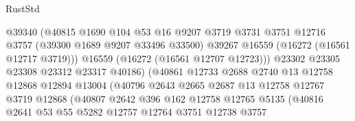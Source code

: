 \begin{lexlean}{RustStd}
\begin{coremodule}
                                    @39340
                                    (@40815
                                      @1690
                                      @104
                                      @53
                                      @16
                                      @9207
                                      @3719
                                      @3731
                                      @3751
                                      @12716
                                      @3757
                                      (@39300 @1689 @9207 @33496 @33500)
                                      @39267
                                      @16559
                                      (@16272 (@16561 @12717 @3719)))
                                    @16559
                                    (@16272 (@16561 @12707 @12723)))
                                  @23302
                                  @23305
                                  @23308
                                  @23312
                                  @23317
                                  @40186)
                                (@40861
                                  @12733
                                  @2688
                                  @2740
                                  @13
                                  @12758
                                  @12868
                                  @12894
                                  @13004
                                  (@40796
                                    @2643
                                    @2665
                                    @2687
                                    @13
                                    @12758
                                    @12767
                                    @3719
                                    @12868
                                    (@40807
                                      @2642
                                      @396
                                      @162
                                      @12758
                                      @12765
                                      @5135
                                      (@40816
                                        @2641
                                        @53
                                        @55
                                        @5282
                                        @12757
                                        @12764
                                        @3751
                                        @12738
                                        @3757

\end{coremodule}
\end{lexlean}

